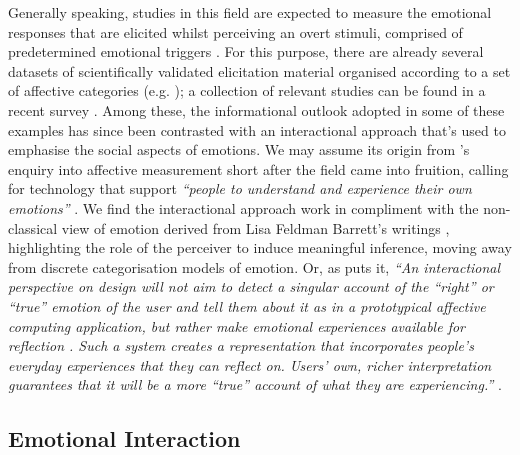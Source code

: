 Generally speaking, studies in this field are expected to measure the emotional responses that are elicited whilst perceiving an overt stimuli, comprised of predetermined emotional triggers \cite{bota_review_2019}. For this purpose, there are already several datasets of scientifically validated elicitation material organised according to a set of affective categories (e.g. \cite{yang_affective_2018,koelstra_deap_2012,bradley_affective_2007}); a collection of relevant studies can be found in a recent survey \cite{sanches_hci_2019}. Among these, the informational outlook adopted in some of these examples has since been contrasted with an interactional approach that's used to emphasise the social aspects of emotions. We may assume its origin from \citeauthor{boehner_how_2007}'s enquiry into affective measurement short after the field came into fruition, calling for technology that support \textit{``people to understand and experience their own emotions''} \cite{boehner_how_2007,boehner_affect_2005}. We find the interactional approach work in compliment with the non-classical view of emotion derived from Lisa Feldman Barrett's writings \cite{barrett_how_2017}, highlighting the role of the perceiver to induce meaningful inference, moving away from discrete categorisation models of emotion. Or, as \citeauthor{hook_interactional_2008} puts it, \textit{``An interactional perspective on design will not aim to detect a singular account of the “right” or “true” emotion of the user and tell them about it as in a prototypical affective computing application, but rather make emotional experiences available for reflection . Such a system creates a representation that incorporates people’s everyday experiences that they can reflect on. Users’ own, richer interpretation guarantees that it will be a more “true” account of what they are experiencing.''} \cite{hook_interactional_2008}.

\subsection*{Emotional Interaction}

